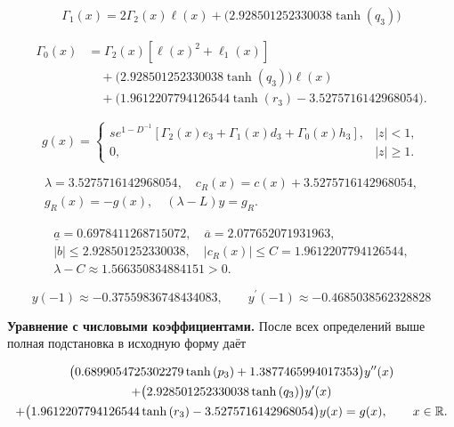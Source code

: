 \begin{equation}
\Gamma_1(x)=2\Gamma_2(x)\ell(x)+\bigl(2.928501252330038 \tanh{\left(q_{3} \right)}\bigr)
\end{equation}


\begin{equation}
\begin{aligned}\Gamma_0(x)&=\Gamma_2(x)[\ell(x)^2+\ell_1(x)]\\&\quad+\bigl(2.928501252330038 \tanh{\left(q_{3} \right)}\bigr)\ell(x)\\&\quad+\bigl(1.9612207794126544 \tanh{\left(r_{3} \right)} - 3.5275716142968054\bigr).\end{aligned}
\end{equation}


\begin{equation}\label{eq:ex7-forcing}
g(x)=\begin{cases}s e^{1-D^{-1}}[\Gamma_2(x)e_{3}+\Gamma_1(x)d_{3}+\Gamma_0(x)h_{3}],&|z|<1,\\0,&|z|\ge1.\end{cases}
\end{equation}


\begin{equation}
\begin{aligned}\lambda=3.5275716142968054,\quad c_R(x)=c(x)+3.5275716142968054,\\g_R(x)=-g(x),\quad (\lambda-L)y=g_R.\end{aligned}
\end{equation}


\begin{equation}
\begin{aligned}\underline a=0.6978411268715072,\quad \overline a=2.077652071931963,\\|b|\le2.928501252330038,\quad |c_R(x)|\le C=1.9612207794126544,\\\lambda-C\approx1.566350834884151>0.\end{aligned}
\end{equation}


\begin{equation}
y(-1)\approx-0.37559836748434083,\qquad y^\prime(-1)\approx-0.4685038562328828
\end{equation}


\noindent\textbf{Уравнение с числовыми коэффициентами.} После всех определений выше полная подстановка в исходную форму даёт

\begin{multline}\label{eq:ex7-ode}\bigl(0.6899054725302279 \tanh{\left(p_{3} \right)} + 1.3877465994017353\bigr)y^{\prime\prime}(x)\\+\bigl(2.928501252330038 \tanh{\left(q_{3} \right)}\bigr)y^\prime(x)\\+\bigl(1.9612207794126544 \tanh{\left(r_{3} \right)} - 3.5275716142968054\bigr)y(x)=g(x),\qquad x\in\mathbb R.\end{multline}

